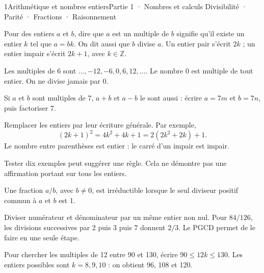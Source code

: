 \begin{ouverture}[algorithmique]{1}{Arithmétique et nombres entiers}{Partie 1 · Nombres et calculs}
{Divisibilité · Parité · Fractions · Raisonnement}
\end{ouverture}
\pagestyle{otMain}\essentiel\fontsize{11}{15}\selectfont
{}
\begin{definition}
Pour des entiers $a$ et $b$, dire que $a$ est un multiple de $b$ signifie qu'il existe un entier $k$ tel que $a=bk$. On dit aussi que $b$ divise $a$. Un entier pair s'écrit $2k$ ; un entier impair s'écrit $2k+1$, avec $k\in\mathbb Z$.
\end{definition}
\begin{exemple}Les multiples de 6 sont $\ldots,-12,-6,0,6,12,\ldots$. Le nombre 0 est multiple de tout entier. On ne divise jamais par 0.\end{exemple}
\begin{propriete}Si $a$ et $b$ sont multiples de 7, $a+b$ et $a-b$ le sont aussi : écrire $a=7m$ et $b=7n$, puis factoriser 7.\end{propriete}
\begin{savoirfaire}
Remplacer les entiers par leur écriture générale. Par exemple,
\[(2k+1)^2=4k^2+4k+1=2(2k^2+2k)+1.\]
Le nombre entre parenthèses est entier : le carré d'un impair est impair.
\end{savoirfaire}
\begin{attention}Tester dix exemples peut suggérer une règle. Cela ne démontre pas une affirmation portant sur tous les entiers.\end{attention}
\clearpage
{}
\begin{definition}Une fraction $a/b$, avec $b\ne0$, est irréductible lorsque le seul diviseur positif commun à $a$ et $b$ est 1.\end{definition}
\begin{savoirfaire}
Diviser numérateur et dénominateur par un même entier non nul. Pour $84/126$, les divisions successives par 2 puis 3 puis 7 donnent $2/3$. Le PGCD permet de le faire en une seule étape.
\end{savoirfaire}
\begin{exemple}
Pour chercher les multiples de 12 entre 90 et 130, écrire $90\le12k\le130$. Les entiers possibles sont $k=8,9,10$ : on obtient 96, 108 et 120.
\end{exemple}
